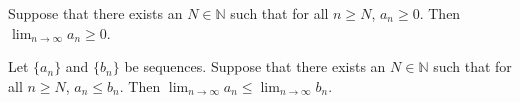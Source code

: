 \begin{lemma}
\label{lem:converges_nonneg}
  \leanok

  Suppose that there exists an $N \in ℕ$ such that for all $n \ge N$, $a_n ≥ 0$.
  Then $\lim_{n \to \infty} a_n ≥ 0$.

\end{lemma}

\begin{theorem}
  \label{thm:order_limit}
  \leanok

  Let $\{a_n\}$ and $\{b_n\}$ be sequences. 
  Suppose that there exists an $N ∈ ℕ$ such that for all $n ≥ N$, $a_n ≤ b_n$.
  Then $\lim_{n \to \infty} a_n \le \lim_{n \to \infty} b_n$.
\end{theorem}